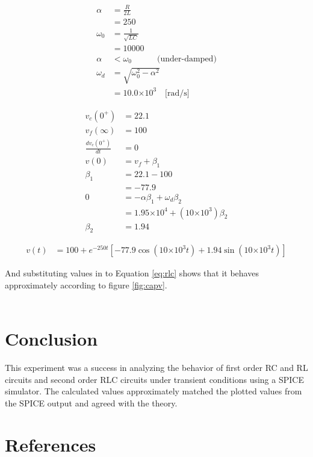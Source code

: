 \documentclass{article}
\providecommand{\e}[1]{\ensuremath{\times 10^{#1}}}
\begin{document}
\begin{align*}
	\alpha &= \frac{R}{2L} \\
			&= 250 \\
	\omega_0 &= \frac{1}{\sqrt{L C}} \\
			&= 10000 \\
	\alpha &< \omega_0 \quad\quad\quad \mbox{(under-damped)} \\
	\omega_d &= \sqrt{\omega_0^2 - \alpha^2} \\
		&= 10.0\e3 \quad \mbox{[rad/s]}
\end{align*}

\begin{align*}
	v_c(0^+) &= 22.1 \\
	v_f(\infty) &= 100 \\
	\frac{dv_c(0^+)}{dt} &= 0 \\
	v(0) &= v_f + \beta_1 \\
	\beta_1 &= 22.1 - 100 \\
			&= -77.9 \\
	0 &= - \alpha \beta_1 + \omega_d \beta_2 \\
	  &= 1.95\e4 + (10\e3) \beta_2 \\
	\beta_2 &= 1.94
\end{align*}

\begin{align}
	v(t) &= 100 + e^{-250 t} \left[ -77.9 \cos(10\e3 t) + 1.94 \sin(10\e3 t) \right] \label{eq:rlc}
\end{align}

And substituting values in to Equation \ref{eq:rlc} shows that it behaves
approximately according to figure \ref{fig:capv}.

\begin{align*}
\end{align*}

\clearpage


\section{Conclusion}

This experiment was a success in analyzing the behavior of first order
RC and RL circuits and second order RLC circuits under transient conditions
using a SPICE simulator.
The calculated values approximately matched the plotted values from
the SPICE output and agreed with the theory.



\renewcommand*{\refname}{\vspace{-8mm}}
\section{References}


\end{document}

